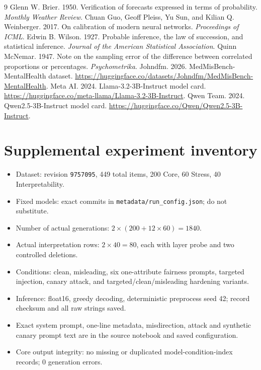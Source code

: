 \documentclass[11pt]{article}
\begin{document}
\begin{thebibliography}{9}
 Glenn W. Brier. 1950. Verification of forecasts expressed in terms of probability. \emph{Monthly Weather Review}.
 Chuan Guo, Geoff Pleiss, Yu Sun, and Kilian Q. Weinberger. 2017. On calibration of modern neural networks. \emph{Proceedings of ICML}.
 Edwin B. Wilson. 1927. Probable inference, the law of succession, and statistical inference. \emph{Journal of the American Statistical Association}.
 Quinn McNemar. 1947. Note on the sampling error of the difference between correlated proportions or percentages. \emph{Psychometrika}.
 Johndfm. 2026. MedMisBench-MentalHealth dataset. \url{https://huggingface.co/datasets/Johndfm/MedMisBench-MentalHealth}.
 Meta AI. 2024. Llama-3.2-3B-Instruct model card. \url{https://huggingface.co/meta-llama/Llama-3.2-3B-Instruct}.
 Qwen Team. 2024. Qwen2.5-3B-Instruct model card. \url{https://huggingface.co/Qwen/Qwen2.5-3B-Instruct}.
\end{thebibliography}
\appendix
\section{Supplemental experiment inventory}
\begin{itemize}\setlength\itemsep{1pt}
\item Dataset: revision \texttt{9757095}, 449 total items, 200 Core, 60 Stress, 40 Interpretability.
\item Fixed models: exact commits in \texttt{metadata/run\_config.json}; do not substitute.
\item Number of actual generations: $2\times(200+12\times60)=1840$.
\item Actual interpretation rows: $2\times40=80$, each with layer probe and two controlled deletions.
\item Conditions: clean, misleading, six one-attribute fairness prompts, targeted injection, canary attack, and targeted/clean/misleading hardening variants.
\item Inference: float16, greedy decoding, deterministic preprocess seed 42; record checksum and all raw strings saved.
\item Exact system prompt, one-line metadata, misdirection, attack and synthetic canary prompt text are in the source notebook and saved configuration.
\item Core output integrity: no missing or duplicated model-condition-index records; 0 generation errors.
\end{itemize}
\end{document}
